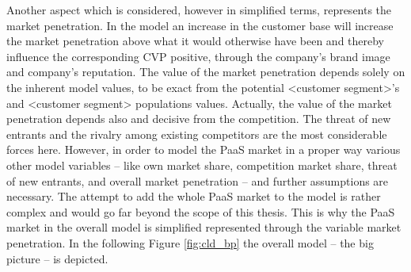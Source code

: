Another aspect which is considered, however in simplified terms, represents the market penetration. In the model an increase in the customer base will increase the market penetration above what it would otherwise have been and thereby influence the corresponding \ac{CVP} positive, through the company's brand image and company's reputation. The value of the market penetration depends solely on the inherent model values, to be exact from the potential <customer segment>'s and <customer segment> populations values. Actually, the value of the market penetration depends also and decisive from the competition. The threat of new entrants and the rivalry among existing competitors \citep[pp. 80-82, 85-86]{Porter2008} are the most considerable forces here. However, in order to model the \ac{PaaS} market in a proper way various other model variables -- like own market share, competition market share, threat of new entrants, and overall market penetration -- and further assumptions are necessary. The attempt to add the whole \ac{PaaS} market to the model is rather complex and would go far beyond the scope of this thesis. This is why the \ac{PaaS} market in the overall model is simplified represented through the variable market penetration. In the following Figure \ref{fig:cld_bp} the overall model -- the big picture -- is depicted.

\newpage




